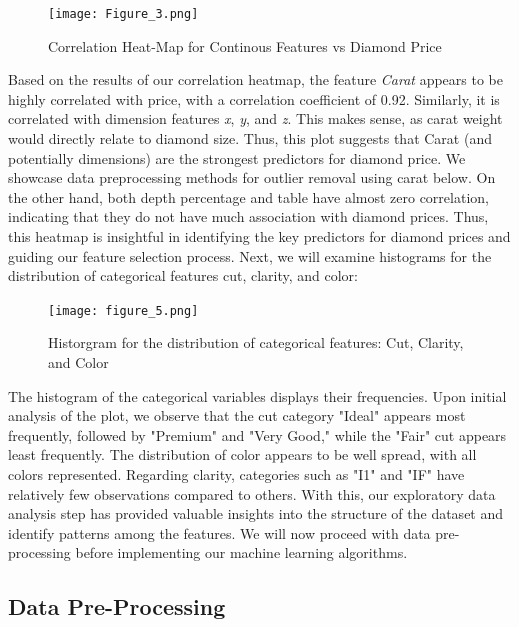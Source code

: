 \documentclass[conference]{IEEEtran}
\begin{document}
\begin{figure}[H]
    \centering
    \texttt{[image: Figure\_3.png]} %
    \caption{Correlation Heat-Map for Continous Features vs Diamond Price}
    \label{fig:image_label}
\end{figure}

Based on the results of our correlation heatmap, the feature \emph{Carat} appears to be highly correlated with price, with a correlation coefficient of 0.92. Similarly, it is correlated with dimension features \emph{x}, \emph{y}, and \emph{z}. This makes sense, as carat weight would directly relate to diamond size. Thus, this plot suggests that Carat (and potentially dimensions) are the strongest predictors for diamond price. We showcase data preprocessing methods for outlier removal using carat below. On the other hand, both depth percentage and table have almost zero correlation, indicating that they do not have much association with diamond prices. Thus, this heatmap is insightful in identifying the key predictors for diamond prices and guiding our feature selection process. Next, we will examine histograms for the distribution of categorical features cut, clarity, and color:

\begin{figure}[H]
    \centering
    \texttt{[image: figure\_5.png]} %
    \caption{Historgram for the distribution of categorical features: Cut, Clarity, and Color }
    \label{fig:image_label}
\end{figure}

The histogram of the categorical variables displays their frequencies. Upon initial analysis of the plot, we observe that the cut category "Ideal" appears most frequently, followed by "Premium" and "Very Good," while the "Fair" cut appears least frequently. The distribution of color appears to be well spread, with all colors represented. Regarding clarity, categories such as "I1" and "IF" have relatively few observations compared to others. With this, our exploratory data analysis step has provided valuable insights into the structure of the dataset and identify patterns among the features. We will now proceed with data pre-processing before implementing our machine learning algorithms.

\subsection{Data Pre-Processing} 
\end{document}
